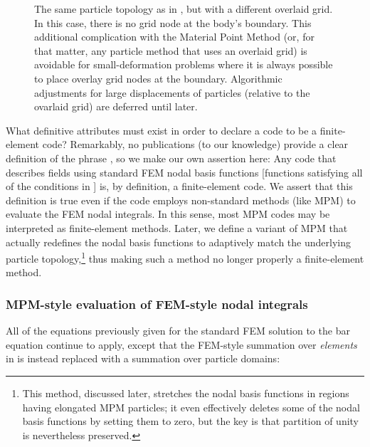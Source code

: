 %
\begin{figure}[h]
\caption{The same particle topology as in , but with a different overlaid grid. In this case, there is no grid node at the body's boundary. This additional complication with the Material Point Method (or, for that matter, any particle method that uses an overlaid grid) is avoidable for small-deformation problems where it is always possible to place overlay grid nodes at the boundary. Algorithmic adjustments for large displacements of particles (relative to the ovarlaid grid) are deferred until later.}
\label{fig:particlesOnOneDgridDifferent}
\end{figure}
%


What definitive attributes must exist in order to declare a code to be a finite-element code? Remarkably, no publications (to our knowledge) provide a clear definition of the phrase , so we make our own assertion here: Any code that describes fields using standard FEM nodal basis functions [\ie functions satisfying all of the conditions in ] is, by definition, a finite-element code. We assert that this definition is true even if the code employs non-standard methods (like MPM) to evaluate the FEM nodal integrals. In this sense, most MPM codes may be interpreted as finite-element methods. Later, we define a variant of MPM that actually redefines the nodal basis functions to adaptively match the underlying particle topology,\footnote{This method, discussed later, stretches the nodal basis functions in regions having elongated MPM particles; it even effectively deletes some of the nodal basis functions by setting them to zero, but the key is that partition of unity is nevertheless preserved.} thus making such a method no longer properly a finite-element method.
%



\subsubsection{MPM-style evaluation of FEM-style nodal integrals}
All of the equations previously given for the standard FEM solution to the bar equation continue to apply, except that the FEM-style summation over \emph{elements} in  is instead replaced with a summation over particle domains:

